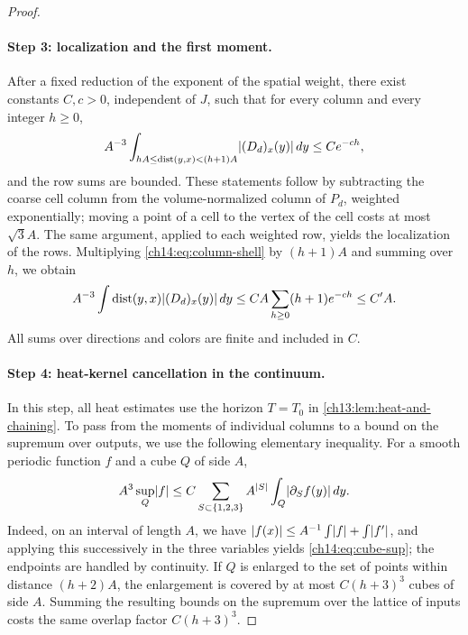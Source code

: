 \begin{proof}
\paragraph{Step 3: localization and the first moment.}
After a fixed reduction of the exponent of the spatial weight, there exist constants $C,c>0$, independent of $J$, such that for every column and every integer $h\ge0$,
\begin{equation}\label{ch14:eq:column-shell}
 A^{-3}\int_{hA\le\operatorname{dist}(y,x)<(h+1)A}\lvert (D_d)_x(y)\rvert\,dy\le Ce^{-ch},
\end{equation}
and the row sums are bounded. These statements follow by subtracting the coarse cell column from the volume-normalized column of $P_d$, weighted exponentially; moving a point of a cell to the vertex of the cell costs at most $\sqrt3A$. The same argument, applied to each weighted row, yields the localization of the rows. Multiplying \eqref{ch14:eq:column-shell} by $(h+1)A$ and summing over $h$, we obtain
\[
 A^{-3}\int\operatorname{dist}(y,x)\lvert (D_d)_x(y)\rvert\,dy\le CA\sum_{h\ge0}(h+1)e^{-ch}\le C'A.
\]
All sums over directions and colors are finite and included in $C$.

\paragraph{Step 4: heat-kernel cancellation in the continuum.}
In this step, all heat estimates use the horizon $T=T_0$ in \cref{ch13:lem:heat-and-chaining}. To pass from the moments of individual columns to a bound on the supremum over outputs, we use the following elementary inequality. For a smooth periodic function $f$ and a cube $Q$ of side $A$,
\begin{equation}\label{ch14:eq:cube-sup}
 A^3\sup_Q\lvert f\rvert\le C\sum_{S\subset\{1,2,3\}}A^{\lvert S\rvert}\int_Q\lvert \partial_Sf(y)\rvert\,dy.
\end{equation}
Indeed, on an interval of length $A$, we have $\lvert f(x)\rvert\le A^{-1}\int\lvert f\rvert+\int\lvert f'\rvert$, and applying this successively in the three variables yields \eqref{ch14:eq:cube-sup}; the endpoints are handled by continuity. If $Q$ is enlarged to the set of points within distance $(h+2)A$, the enlargement is covered by at most $C(h+3)^3$ cubes of side $A$. Summing the resulting bounds on the supremum over the lattice of inputs costs the same overlap factor $C(h+3)^3$.


\end{proof}
